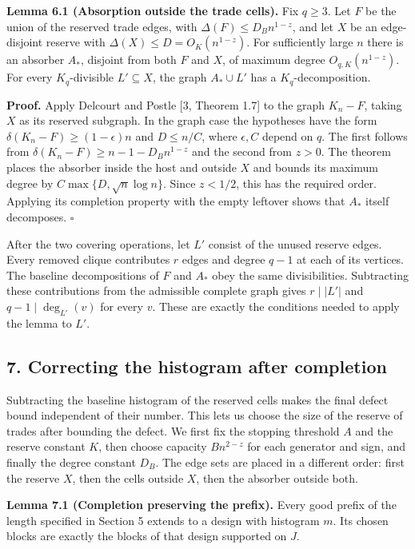 \documentclass[english,11pt,a4paper]{article}
\begin{document}
\textbf{Lemma 6.1 (Absorption outside the trade cells).} Fix \(q\ge3\). Let \(F\) be the union of the reserved trade edges, with \(\Delta(F)\le D_Bn^{1-z}\), and let \(X\) be an edge-disjoint reserve with \(\Delta(X)\le D=O_K(n^{1-z})\). For sufficiently large \(n\) there is an absorber \(A_*\), disjoint from both \(F\) and \(X\), of maximum degree \(O_{q,K}(n^{1-z})\). For every \(K_q\)-divisible \(L'\subseteq X\), the graph \(A_*\cup L'\) has a \(K_q\)-decomposition.

\textbf{Proof.} Apply Delcourt and Postle {[}3, Theorem 1.7{]} to the graph \(K_n-F\), taking \(X\) as its reserved subgraph. In the graph case the hypotheses have the form \(\delta(K_n-F)\ge(1-\epsilon)n\) and \(D\le n/C\), where \(\epsilon,C\) depend on \(q\). The first follows from \(\delta(K_n-F)\ge n-1-D_Bn^{1-z}\) and the second from \(z>0\). The theorem places the absorber inside the host and outside \(X\) and bounds its maximum degree by \(C\max\{D,\sqrt n\log n\}\). Since \(z<1/2\), this has the required order. Applying its completion property with the empty leftover shows that \(A_*\) itself decomposes. \(\square\)

After the two covering operations, let \(L'\) consist of the unused reserve edges. Every removed clique contributes \(r\) edges and degree \(q-1\) at each of its vertices. The baseline decompositions of \(F\) and \(A_*\) obey the same divisibilities. Subtracting these contributions from the admissible complete graph gives \(r\mid |L'|\) and \(q-1\mid\deg_{L'}(v)\) for every \(v\). These are exactly the conditions needed to apply the lemma to \(L'\).

\subsection{7. Correcting the histogram after completion}\label{correcting-the-histogram-after-completion}

Subtracting the baseline histogram of the reserved cells makes the final defect bound independent of their number. This lets us choose the size of the reserve of trades after bounding the defect. We first fix the stopping threshold \(A\) and the reserve constant \(K\), then choose capacity \(Bn^{2-z}\) for each generator and sign, and finally the degree constant \(D_B\). The edge sets are placed in a different order: first the reserve \(X\), then the cells outside \(X\), then the absorber outside both.

\textbf{Lemma 7.1 (Completion preserving the prefix).} Every good prefix of the length specified in Section 5 extends to a design with histogram \(m\). Its chosen blocks are exactly the blocks of that design supported on \(J\).
\end{document}
